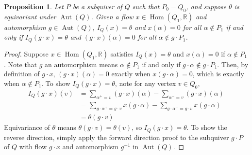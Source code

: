 \documentclass[11pt]{amsart}
\theoremstyle{plain}
\newtheorem{proposition}[theorem]{Proposition}
\theoremstyle{definition}
\newcommand{\R}{\mathbb{R}}
\DeclareMathOperator{\aut}{Aut}
\DeclareMathOperator{\Hom}{Hom}
\renewcommand{\hom}{\Hom}
\begin{document}
\begin{proposition} \label{welldefined-action}
    Let $P$ be a subquiver of $Q$ such that $P_0 = Q_0$, and suppose $\theta$ is equivariant under $\aut(Q)$. Given a flow $x \in \hom(Q_1, \R)$ and automorphism $g \in \aut(Q)$, $I_Q(x) = \theta$ and $x(\alpha) = 0$ for all $\alpha \not\in P_1$ if and only if $I_Q(g \cdot x) = \theta$ and $(g \cdot x)(\alpha) = 0$ for all $\alpha \not\in g \cdot P_1$.
\end{proposition}
\begin{proof}
    Suppose $x \in \hom(Q_1, \R)$ satisfies $I_Q(x) = \theta$ and $x(\alpha) = 0$ if $\alpha \not\in P_1$. Note that $g$ an automorphism means $\alpha \not\in P_1$ if and only if $g \cdot \alpha \not\in g \cdot P_1$. Then, by definition of $g \cdot x$, $(g \cdot x)(\alpha) = 0$ exactly when $x(g \cdot \alpha) = 0$, which is exactly when $\alpha \not\in P_1$. To show $I_Q(g\cdot x) = \theta$, note for any vertex $v \in Q_0$,
    \begin{align*}
    I_Q(g\cdot x)(v) &= \sum_{\alpha^+ = v}(g \cdot x)(\alpha) - \sum_{\alpha^- = v}(g \cdot x)(\alpha) \\
    &= \sum_{g\cdot \alpha^+ = g\cdot v}x(g\cdot \alpha) - \sum_{g\cdot \alpha^- = g\cdot v}x(g\cdot \alpha) \\
    &= \theta(g\cdot v)
    \end{align*}
    Equivariance of $\theta$ means $\theta(g \cdot v) = \theta(v)$, so $I_Q(g \cdot x) = \theta$. To show the reverse direction, simply apply the forward direction proof to the subquiver $g \cdot P$ of $Q$ with flow $g \cdot x$ and automorphism $g^{-1}$ in $\aut(Q)$.
\end{proof}
\end{document}
